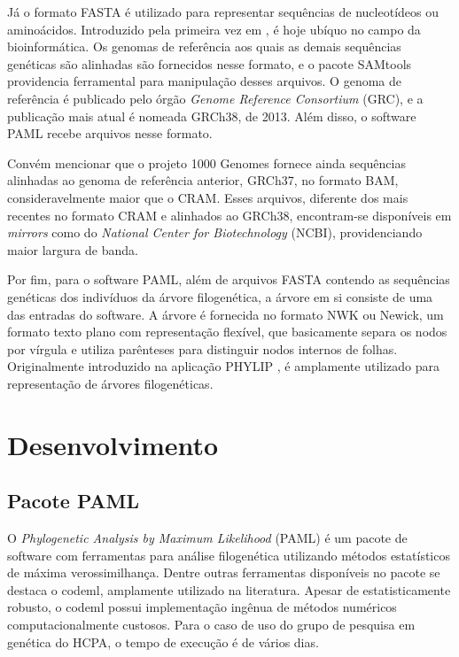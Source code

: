\documentclass[cic,tc]{iiufrgs}
\begin{document}
Já o formato FASTA é utilizado para representar sequências
de nucleotídeos ou aminoácidos. Introduzido pela primeira vez em
\cite{fasta}, é hoje ubíquo no campo da
bioinformática.\cite{shen2016seqkit} Os genomas de referência aos quais as
demais sequências genéticas são alinhadas são fornecidos nesse formato, e o
pacote SAMtools providencia ferramental para manipulação desses arquivos. O
genoma de referência é publicado pelo órgão \textit{Genome Reference
Consortium} (GRC), e a publicação mais atual é nomeada GRCh38, de
2013.\cite{GUO201783} Além disso, o software PAML recebe arquivos nesse formato.

Convém mencionar que o projeto 1000 Genomes fornece ainda sequências alinhadas
ao genoma de referência anterior, GRCh37, no formato BAM, consideravelmente
maior que o CRAM. Esses arquivos, diferente dos mais recentes no formato CRAM e
alinhados ao GRCh38, encontram-se disponíveis em \textit{mirrors} como do
\textit{National Center for Biotechnology} (NCBI), providenciando maior largura
de banda.\cite{clarke20121000}

Por fim, para o software PAML, além de arquivos FASTA contendo as sequências
genéticas dos indivíduos da árvore filogenética, a árvore em si consiste de uma
das entradas do software. A árvore é fornecida no formato NWK ou Newick, um
formato texto plano com representação flexível, que basicamente separa os nodos
por vírgula e utiliza parênteses para distinguir nodos internos de folhas.
Originalmente introduzido na aplicação PHYLIP \cite{felsenstein1993phylip}, é
amplamente utilizado para representação de árvores filogenéticas.\cite{fredslund2006phy}

\chapter{Desenvolvimento}

\section{Pacote PAML}

O \textit{Phylogenetic Analysis by Maximum Likelihood} (PAML) é um pacote de
software com ferramentas para análise filogenética utilizando métodos
estatísticos de máxima verossimilhança.\cite{yang2007paml} Dentre
outras ferramentas disponíveis no pacote se destaca o codeml,
amplamente utilizado na literatura.\cite{maldonado2016lmap} Apesar de
estatisticamente robusto,\cite{maldonado2016lmap} o codeml possui
implementação ingênua de métodos numéricos computacionalmente
custosos.\cite{yang2020paml} Para o caso de uso do grupo de pesquisa em
genética do HCPA, o tempo de execução é de vários dias.
\end{document}
